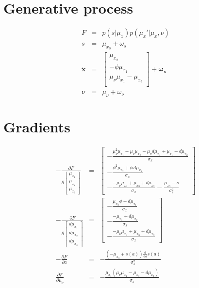 \documentclass[a4paper]{report}
\begin{document}
\section*{Generative process}

\begin{eqnarray}
  F&=&p(s|\mu_x)p(\mu_x'|\mu_x,\nu)\nonumber\\
  s &=& \mu_{x_3} + \omega_s \nonumber \\
  \dot{\mathbf{x}} &=&
  \left[\begin{array}{c}
  \mu_{x_2} \\
  -\phi\mu_{x_1} \\
  \mu_{\nu}\mu_{x_1} - \mu_{x_3} \\
  \end{array}\right] +\boldsymbol{\omega_x}\nonumber \\
  \nu &=& \mu_{\nu} + \omega_{\nu} \nonumber
\end{eqnarray}

\section*{Gradients}
\begin{eqnarray}
- \frac{\partial F}{\partial
  \left[\begin{matrix}\mu_{x_1}\\\mu_{x_2}\\\mu_{x_3}\end{matrix}\right]} &=&
  \left[\begin{matrix}- \frac{\mu_{\nu}^{2} \mu_{x_1} - \mu_{\nu} \mu_{x_3} -
  \mu_{\nu} d\mu_{x_3} + \mu_{x_1} - d\mu_{x_2}}{\sigma_x}\\-
  \frac{\phi^{2}\mu_{x_2} + \phi\,d\mu_{x_1}}{\sigma_x}\\- \frac{- \mu_{\nu}
  \mu_{x_1} + \mu_{x_3} + d\mu_{x_3}}{\sigma_x} - \frac{\mu_{x_3} -
  s}{\sigma_s^{2}}\end{matrix}\right] \nonumber \\ - \frac{\partial F}{\partial
  \left[\begin{matrix}d\mu_{x_1}\\d\mu_{x_2}\\d\mu_{x_3}\end{matrix}\right]} &=&
  \left[\begin{matrix}- \frac{\mu_{x_2} \phi + d\mu_{x_1}}{\sigma_x}\\- \frac{-
  \mu_{x_1} + d\mu_{x_2}}{\sigma_x}\\- \frac{- \mu_{\nu} \mu_{x_1} + \mu_{x_3} +
  d\mu_{x_3}}{\sigma_x}\end{matrix}\right] \nonumber\\ - \frac{\partial
  F}{\partial a} &=& - \frac{\left(- \mu_{x_3} + s{\left(a \right)}\right)
  \frac{d}{d a} s{\left(a \right)}}{\sigma_s^{2}} \nonumber \\ \frac{\partial
  F}{\partial\mu_{\nu}} &=& - \frac{\mu_{x_1} \left(\mu_{\nu} \mu_{x_1} -
  \mu_{x_3} - d\mu_{x_3}\right)}{\sigma_x}
\end{eqnarray}
\end{document}

